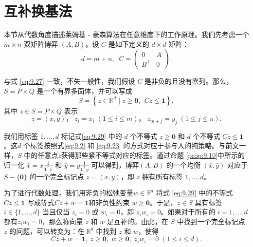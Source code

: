 \section{互补换基法} \label{sec9.7}


本节从代数角度描述莱姆基 - 豪森算法在任意维度下的工作原理。我们先考虑一个 \(m \times  n\) 双矩阵博弈 $(A, B)$。设 \(C\) 是如下定义的 \(d \times  d\) 矩阵：
\begin{equation}
\label{eq:9.28}
d = m + n,\;\;C = \left( \begin{matrix} 0 & A \\  {B}^{\top } & 0 \end{matrix}\right) .
\end{equation}



与式 \eqref{eq:9.27} 一致，不失一般性，我们假设 \(C\) 是非负的且没有零列。那么，\(S = P \times  Q\) 是一个有界多面体，并可以写成
\begin{equation}
\label{eq:9.29}
S = \left\{  {z \in  {\mathbb{R}}^{d} \mid  z \geq  \mathbf{0}, ~~ {Cz} \leq  \mathbf{1}}\right\},
\end{equation}
其中 \(z \in  S = P \times  Q\) 表示
\begin{equation}
\label{eq:9.30}
z = \left( {x,y}\right)，\;{z}_{i} = {x}_{i}\;\left( {1 \leq  i \leq  m}\right)，\;{z}_{m + j} = {y}_{j}\;\left( {1 \leq  j \leq  n}\right).
\end{equation}


我们用标签 \(1,\ldots,d\) 标记式\eqref{eq:9.29} 中的 \(d\) 个不等式 \(z \geq  \mathbf{0}\) 和 \(d\) 个不等式 \({Cz} \leq  \mathbf{1}\)。这\(d\) 个标签按照式\eqref{eq:9.2} 和 \eqref{eq:9.23} 的方式对应于参与人的纯策略。与前文一样，\(S\) 中的任意点\(z\)获得那些紧不等式对应的标签。通过命题 \ref{prop:9.10}中所示的归一化 \(\bar{x} = x\frac{1}{{\mathbf{1}}^{\top }x}\) 和 \(\bar{y} = y\frac{1}{{\mathbf{1}}^{\top }y}\) 可以得到，博弈$(A, B)$ 的一个均衡 \(\left( {\bar{x},\bar{y}}\right)\) 对应于 \(S - \{ \mathbf{0}\}\) 的一个完全标记点 \(z = \left( {x,y}\right)\)，即 \(z\) 拥有所有标签 \(1,\ldots,d\)。

为了进行代数处理，我们用非负的松弛变量\(w \in  {\mathbb{R}}^{d}\) 将式 \eqref{eq:9.29} 中的不等式 \({Cz} \leq  \mathbf{1}\) 写成等式\({Cz} + w = \mathbf{1}\)和非负性约束 \(w \geq  \mathbf{0}\)。于是，\(z \in  S\) 具有标签 \(i \in  \{ 1,\ldots,d\}\) 当且仅当 \({z}_{i} = 0\) 或 \({w}_{i} = 0\)，即 \({z}_{i}{w}_{i} = 0\)。如果对于所有的 \(i = 1,\ldots,d\) 都有\({z}_{i}{w}_{i} = 0\)，那么称向量 \(z\) 和 \(w\) 是互补的。由此，在 \(S\) 中找到一个完全标记点 \(z\) 的问题，可以转变为：在 \({\mathbb{R}}^{d}\) 中找到 \(z\) 和 \(w\)，使得
\begin{equation}
\label{eq:9.31}
{Cz} + w = \mathbf{1},\;z \geq  \mathbf{0},\;w \geq  \mathbf{0},\;{z}_{i}{w}_{i} = 0\;\left( {1 \leq  i \leq  d}\right).
\end{equation}


